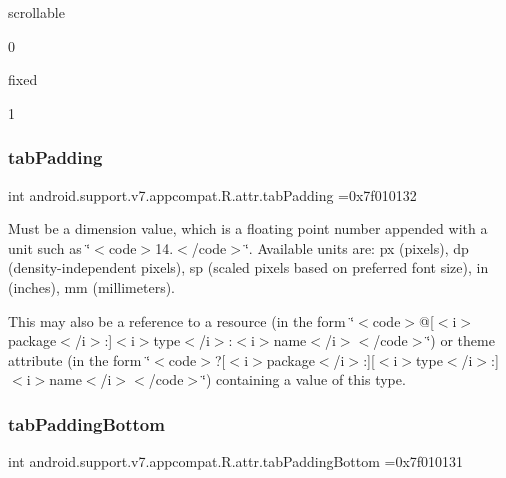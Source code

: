 {\ttfamily scrollable}

0

{\ttfamily fixed}

1\mbox{\label{classandroid_1_1support_1_1v7_1_1appcompat_1_1R_1_1attr_ac37623bb19deedc0d9bdba8edec8c166}} 
\subsubsection{\texorpdfstring{tab\+Padding}{tabPadding}}
{\footnotesize\ttfamily int android.\+support.\+v7.\+appcompat.\+R.\+attr.\+tab\+Padding =0x7f010132\hspace{0.3cm}{\ttfamily [static]}}

Must be a dimension value, which is a floating point number appended with a unit such as \char`\"{}$<$code$>$14.\+5sp$<$/code$>$\char`\"{}. Available units are\+: px (pixels), dp (density-\/independent pixels), sp (scaled pixels based on preferred font size), in (inches), mm (millimeters). 

This may also be a reference to a resource (in the form \char`\"{}$<$code$>$@\mbox{[}$<$i$>$package$<$/i$>$\+:\mbox{]}$<$i$>$type$<$/i$>$\+:$<$i$>$name$<$/i$>$$<$/code$>$\char`\"{}) or theme attribute (in the form \char`\"{}$<$code$>$?\mbox{[}$<$i$>$package$<$/i$>$\+:\mbox{]}\mbox{[}$<$i$>$type$<$/i$>$\+:\mbox{]}$<$i$>$name$<$/i$>$$<$/code$>$\char`\"{}) containing a value of this type. \mbox{\label{classandroid_1_1support_1_1v7_1_1appcompat_1_1R_1_1attr_ac6b8ff7fa2ba7d246035a5176ee4a1da}} 
\subsubsection{\texorpdfstring{tab\+Padding\+Bottom}{tabPaddingBottom}}
{\footnotesize\ttfamily int android.\+support.\+v7.\+appcompat.\+R.\+attr.\+tab\+Padding\+Bottom =0x7f010131\hspace{0.3cm}{\ttfamily [static]}}

